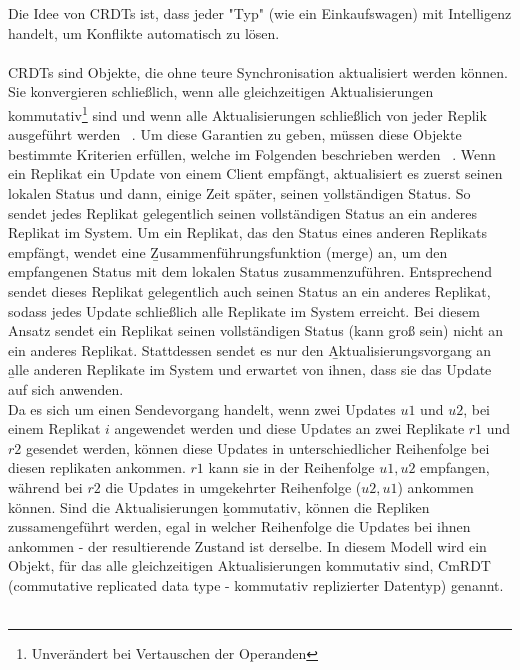   Die Idee von \glspl{CRDT} ist, dass jeder "Typ" (wie ein Einkaufswagen) mit Intelligenz handelt, um Konflikte automatisch zu lösen.\\\\
  CRDTs sind Objekte, die ohne teure Synchronisation aktualisiert werden können. Sie konvergieren schließlich, wenn alle gleichzeitigen Aktualisierungen kommutativ\footnote{Unverändert bei Vertauschen der Operanden} sind und wenn alle Aktualisierungen schließlich von jeder Replik ausgeführt werden ~\cite{crdt_shapiro}.
  Um diese Garantien zu geben, müssen diese Objekte bestimmte Kriterien erfüllen, welche im Folgenden beschrieben werden ~\cite{crdt_shapiro2}.
  Wenn ein Replikat ein Update von einem Client empfängt, aktualisiert es zuerst seinen lokalen Status und dann, einige Zeit später, seinen \b{vollständigen Status}. So sendet jedes Replikat gelegentlich seinen vollständigen Status an ein anderes Replikat im System. Um ein Replikat, das den Status eines anderen Replikats empfängt, wendet eine \b{Zusammenführungsfunktion} (merge) an, um den empfangenen Status mit dem lokalen Status zusammenzuführen. Entsprechend sendet dieses Replikat gelegentlich auch seinen Status an ein anderes Replikat, sodass jedes Update schließlich alle Replikate im System erreicht.
  Bei diesem Ansatz sendet ein Replikat seinen vollständigen Status (kann groß sein) nicht an ein anderes Replikat. Stattdessen sendet es nur den \b{Aktualisierungsvorgang} an \b{alle} anderen Replikate im System und erwartet von ihnen, dass sie das Update auf sich anwenden.\\
  Da es sich um einen Sendevorgang handelt, wenn zwei Updates $u1$ und $u2$, bei einem Replikat $i$ angewendet werden und diese Updates an zwei Replikate $r1$ und $r2$ gesendet werden, können diese Updates in unterschiedlicher Reihenfolge bei diesen replikaten ankommen. $r1$ kann sie in der Reihenfolge $u1, u2$ empfangen, während bei $r2$ die Updates in umgekehrter Reihenfolge ($u2, u1$) ankommen können. Sind die Aktualisierungen \b{kommutativ}, können die Repliken zussamengeführt werden, egal in welcher Reihenfolge die Updates bei ihnen ankommen - der resultierende Zustand ist derselbe. In diesem Modell wird ein Objekt, für das alle gleichzeitigen Aktualisierungen kommutativ sind, CmRDT (commutative replicated data type - kommutativ replizierter Datentyp) genannt. \\\\
